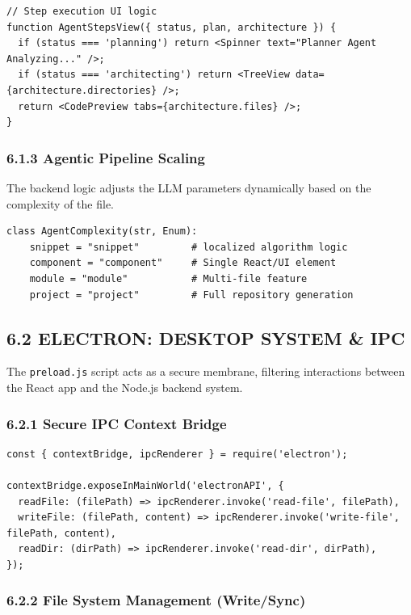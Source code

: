 \documentclass[
  12pt,
]{article}
\begin{document}
\begin{verbatim}
// Step execution UI logic
function AgentStepsView({ status, plan, architecture }) {
  if (status === 'planning') return <Spinner text="Planner Agent Analyzing..." />;
  if (status === 'architecting') return <TreeView data={architecture.directories} />;
  return <CodePreview tabs={architecture.files} />;
}
\end{verbatim}

\subsubsection{6.1.3 Agentic Pipeline
Scaling}\label{agentic-pipeline-scaling}

The backend logic adjusts the LLM parameters dynamically based on the
complexity of the file.

\begin{verbatim}
class AgentComplexity(str, Enum):
    snippet = "snippet"         # localized algorithm logic
    component = "component"     # Single React/UI element
    module = "module"           # Multi-file feature
    project = "project"         # Full repository generation
\end{verbatim}

\subsection{6.2 ELECTRON: DESKTOP SYSTEM \&
IPC}\label{electron-desktop-system-ipc}

The \texttt{preload.js} script acts as a secure membrane, filtering
interactions between the React app and the Node.js backend system.

\subsubsection{6.2.1 Secure IPC Context
Bridge}\label{secure-ipc-context-bridge}

\begin{verbatim}
const { contextBridge, ipcRenderer } = require('electron');

contextBridge.exposeInMainWorld('electronAPI', {
  readFile: (filePath) => ipcRenderer.invoke('read-file', filePath),
  writeFile: (filePath, content) => ipcRenderer.invoke('write-file', filePath, content),
  readDir: (dirPath) => ipcRenderer.invoke('read-dir', dirPath),
});
\end{verbatim}

\subsubsection{6.2.2 File System Management
(Write/Sync)}\label{file-system-management-writesync}
\end{document}
